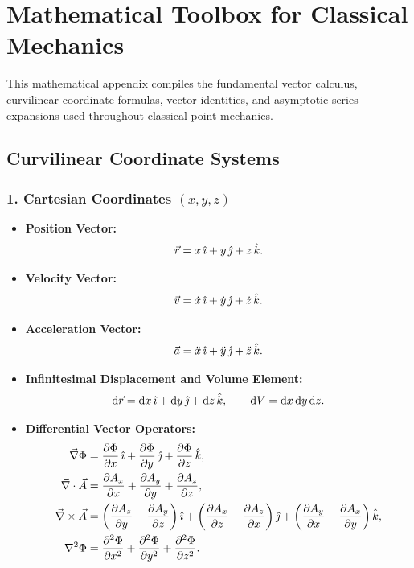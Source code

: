 \chapter{Mathematical Toolbox for Classical Mechanics}
\label{app:math}

This mathematical appendix compiles the fundamental vector calculus, curvilinear coordinate formulas, vector identities, and asymptotic series expansions used throughout classical point mechanics.

\section{Curvilinear Coordinate Systems}

\subsection{1. Cartesian Coordinates $(x, y, z)$}
\begin{itemize}[leftmargin=1.5em,itemsep=3pt]
  \item \textbf{Position Vector:}
  \[
  \vec{r} = x\,\hat{\imath} + y\,\hat{\jmath} + z\,\hat{k}.
  \]
  \item \textbf{Velocity Vector:}
  \[
  \vec{v} = \dot{x}\,\hat{\imath} + \dot{y}\,\hat{\jmath} + \dot{z}\,\hat{k}.
  \]
  \item \textbf{Acceleration Vector:}
  \[
  \vec{a} = \ddot{x}\,\hat{\imath} + \ddot{y}\,\hat{\jmath} + \ddot{z}\,\hat{k}.
  \]
  \item \textbf{Infinitesimal Displacement and Volume Element:}
  \[
  \mathrm{d}\vec{r} = \mathrm{d} x\,\hat{\imath} + \mathrm{d} y\,\hat{\jmath} + \mathrm{d} z\,\hat{k}, \qquad \mathrm{d} V = \mathrm{d} x\,\mathrm{d} y\,\mathrm{d} z.
  \]
  \item \textbf{Differential Vector Operators:}
  \begin{align*}
  \vec{\nabla} \Phi &= \frac{\partial\Phi}{\partial x}\,\hat{\imath} + \frac{\partial\Phi}{\partial y}\,\hat{\jmath} + \frac{\partial\Phi}{\partial z}\,\hat{k}, \\
  \vec{\nabla} \cdot \vec{A} &= \frac{\partial A_x}{\partial x} + \frac{\partial A_y}{\partial y} + \frac{\partial A_z}{\partial z}, \\
  \vec{\nabla} \times \vec{A} &= \left(\frac{\partial A_z}{\partial y} - \frac{\partial A_y}{\partial z}\right)\hat{\imath} + \left(\frac{\partial A_x}{\partial z} - \frac{\partial A_z}{\partial x}\right)\hat{\jmath} + \left(\frac{\partial A_y}{\partial x} - \frac{\partial A_x}{\partial y}\right)\hat{k}, \\
  \nabla^2 \Phi &= \frac{\partial^2\Phi}{\partial x^2} + \frac{\partial^2\Phi}{\partial y^2} + \frac{\partial^2\Phi}{\partial z^2}.
  \end{align*}
\end{itemize}

